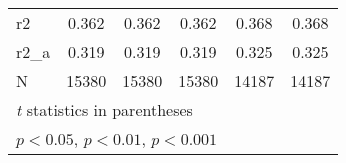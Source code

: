 {\begin{tabular}{l*{5}{c}}
r2          &       0.362         &       0.362         &       0.362         &       0.368         &       0.368         \\
r2\_a        &       0.319         &       0.319         &       0.319         &       0.325         &       0.325         \\
N           &       15380         &       15380         &       15380         &       14187         &       14187         \\
\hline\hline
\multicolumn{6}{l}{\footnotesize \textit{t} statistics in parentheses}\\
\multicolumn{6}{l}{\footnotesize \sym{*} \(p<0.05\), \sym{**} \(p<0.01\), \sym{***} \(p<0.001\)}\\
\end{tabular}
}
